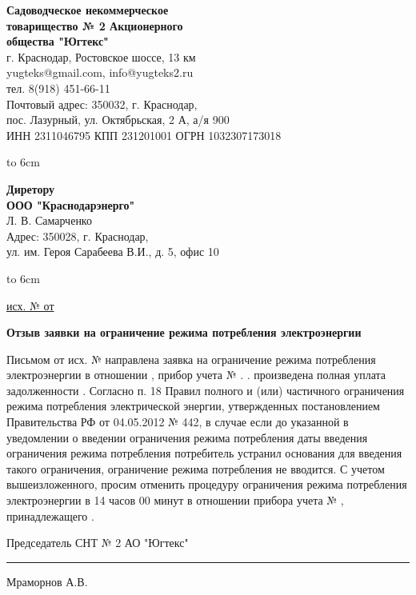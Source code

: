 \noindent\parbox[l][71mm]{80mm}
{
	 \begin{center}
 {\small \textbf{Садоводческое некоммерческое\\ товарищество
 	№  2 Акционерного\\ общества "Югтекс"\\
 }}
 \footnotesize{г. Краснодар, Ростовское шоссе, 13 км\\
 	yugteks@gmail.com, info@yugteks2.ru\\
 	тел. 8(918) 451-66-11\\
 	Почтовый адрес: 350032, г. Краснодар,\\ пос. Лазурный, ул. Октябрьская, 2 А, а/я   900
  }\\
 {ИНН 2311046795 КПП 231201001 ОГРН 1032307173018}
		\end{center}
\hbox to 6cm{ }}\hfill
\parbox[l][71mm]{65mm}
{ \begin{center}
	\small{
	\textbf{Диретору\\ ООО "Краснодарэнерго"}\\
	\vspace{3mm}
	Л. В. Самарченко\\
	\vspace{3mm}
 {\footnotesize Адрес: 350028, г. Краснодар,\\ ул. им. Героя Сарабеева В.И., д. 5, офис 10}

	}
\end{center}
\hbox to 6cm{ }}
\linebreak
\vspace{-12mm}

\underline{исх. №   от  } 

\vspace{8mm}
\begin{center}
	\Large\textbf{Отзыв заявки на ограничение режима потребления электроэнергии}
\end{center}
\par
\vspace{10mm}


Письмом от          исх. №         направлена заявка на ограничение режима потребления электроэнергии в отношении , прибор учета  № .           .
 произведена полная уплата задолженности      .
Согласно п. 18 Правил полного и (или) частичного ограничения режима потребления электрической энергии, утвержденных постановлением Правительства РФ от 04.05.2012 № 442, в случае если до указанной в уведомлении о введении ограничения режима потребления даты введения ограничения режима потребления потребитель устранил основания для введения такого ограничения, ограничение режима потребления не вводится.
С учетом вышеизложенного, просим отменить процедуру ограничения режима потребления электроэнергии в 14 часов 00 минут     в отношении прибора учета   № , принадлежащего . 

\vspace{5mm}



\vspace{15mm}
\noindent Председатель СНТ № 2 АО "Югтекс" \hfill    \rule{3cm}{0.1 mm}    Мраморнов А.В.

\pagebreak



